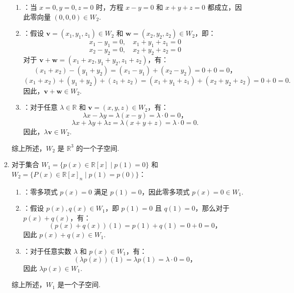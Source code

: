 \begin{exercise}
\begin{exgroup}
\begin{answer}
\begin{enumerate}
                \begin{enumerate}
                    \item {}：当 $x = 0, y = 0, z = 0$ 时，方程 $x - y = 0$ 和 $x + y + z = 0$ 都成立，因此零向量 $(0, 0, 0) \in W_2$.
                    \item {}：假设 $\mathbf{v} = (x_1, y_1, z_1) \in W_2$ 和 $\mathbf{w} = (x_2, y_2, z_2) \in W_2$，即：
                    \[
                    x_1 - y_1 = 0, \quad x_1 + y_1 + z_1 = 0
                    \]
                    \[
                    x_2 - y_2 = 0, \quad x_2 + y_2 + z_2 = 0
                    \]
                    对于 $\mathbf{v} + \mathbf{w} = (x_1 + x_2, y_1 + y_2, z_1 + z_2)$，有：
                    \[
                    (x_1 + x_2) - (y_1 + y_2) = (x_1 - y_1) + (x_2 - y_2) = 0 + 0 = 0，
                    \]
                    \[
                    (x_1 + x_2) + (y_1 + y_2) + (z_1 + z_2) = (x_1 + y_1 + z_1) + (x_2 + y_2 + z_2) = 0 + 0 = 0.
                    \]
                    因此，$\mathbf{v} + \mathbf{w} \in W_2$.
                    \item {}：对于任意 $\lambda \in \mathbb{R}$ 和 $\mathbf{v} = (x, y, z) \in W_2$，有：
                    \[
                    \lambda x - \lambda y = \lambda (x - y) = \lambda \cdot 0 = 0，
                    \]
                    \[
                    \lambda x + \lambda y + \lambda z = \lambda (x + y + z) = \lambda \cdot 0 = 0.
                    \]
                    因此，$\lambda \mathbf{v} \in W_2$.
                \end{enumerate}
                综上所述，$W_2$ 是 $\mathbb{R}^3$ 的一个子空间.

                \item 对于集合 $W_1 = \{p(x) \in \mathbb{R}[x] \mid p(1) = 0\}$ 和 $W_2 = \{P(x) \in \mathbb{R}[x]_n \mid p(1) = p(0)\}$：

                \begin{enumerate}
                    \item {}：零多项式 $p(x) = 0$ 满足 $p(1) = 0$，因此零多项式 $p(x) = 0 \in W_1$.
                    \item {}：假设 $p(x), q(x) \in W_1$，即 $p(1) = 0$ 且 $q(1) = 0$，那么对于 $p(x) + q(x)$，有：
                    \[
                    (p(x) + q(x))(1) = p(1) + q(1) = 0 + 0 = 0，
                    \]
                    因此 $p(x) + q(x) \in W_1$.
                    \item {}：对于任意实数 $\lambda$ 和 $p(x) \in W_1$，有：
                    \[
                    (\lambda p(x))(1) = \lambda p(1) = \lambda \cdot 0 = 0，
                    \]
                    因此 $\lambda p(x) \in W_1$.
                \end{enumerate}
                综上所述，$W_1$ 是一个子空间.


\end{enumerate}
\end{answer}
\end{exgroup}
\end{exercise}
